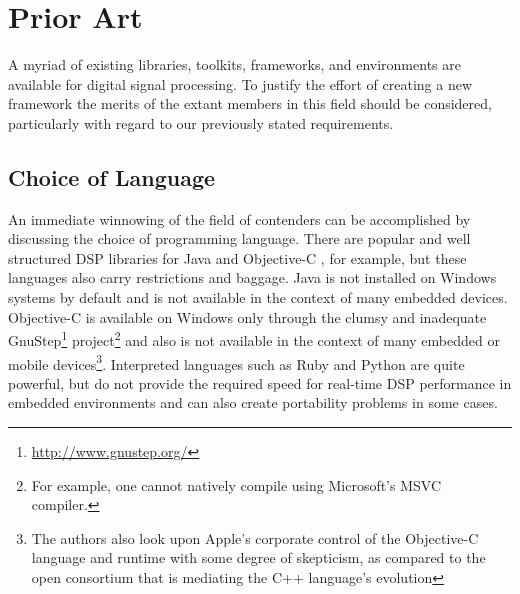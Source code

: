\documentclass[twoside,10pt]{article}
\begin{document}




\section{Prior Art} %
\label{sec:prior_art}

A myriad of existing libraries, toolkits, frameworks, and environments are available for digital signal processing.  To justify the effort of creating a new framework the merits of the extant members in this field should be considered, particularly with regard to our previously stated requirements.


\subsection{Choice of Language} %

An immediate winnowing of the field of contenders can be accomplished by discussing the choice of programming language.  There are popular and well structured DSP libraries for Java \cite{Guillemard:2005, Burk:1998} and Objective-C \cite{Jaffe:1989,Jaffe:1991}, for example, but these languages also carry restrictions and baggage.  Java is not installed on Windows systems by default and is not available in the context of many embedded devices.  Objective-C is available on Windows only through the clumsy and inadequate GnuStep\footnote{\url{http://www.gnustep.org/}} project\footnote{For example, one cannot natively compile using Microsoft's MSVC compiler.} and also is not available in the context of many embedded or mobile devices\footnote{The authors also look upon Apple's corporate control of the Objective-C language and runtime with some degree of skepticism, as compared to the open consortium that is mediating the C++ language's evolution}.  Interpreted languages such as Ruby and Python are quite powerful, but do not provide the required speed for real-time DSP performance in embedded environments and can also create portability problems in some cases. %
\end{document}
